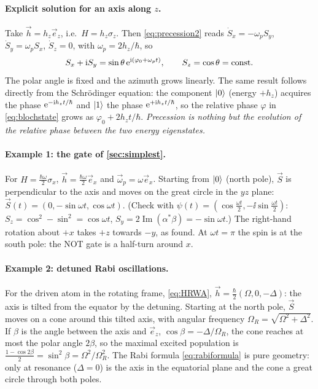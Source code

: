 \paragraph{Explicit solution for an axis along $z$.} Take $\vec h=h_z\vec e_z$, i.e.\ $H=h_z\sigma_z$. Then \cref{eq:precession2} reads $\dot S_x=-\omega_pS_y$,
$\dot S_y=\omega_pS_x$, $\dot S_z=0$, with $\omega_p=2h_z/\hbar$, so
\begin{equation}
  S_x+\mathrm i S_y=\sin\theta\,\mathrm e^{\mathrm i(\varphi_0+\omega_pt)},\qquad S_z=\cos\theta=\text{const}.
\end{equation}
The polar angle is fixed and the azimuth grows linearly. The same result follows directly from the Schrödinger equation: the component $\left|0\right\rangle$ (energy $+h_z$) acquires the
phase $\mathrm e^{-\mathrm i h_zt/\hbar}$ and $\left|1\right\rangle$ the phase $\mathrm e^{+\mathrm i h_zt/\hbar}$, so the relative phase $\varphi$ in \cref{eq:blochstate} grows as $\varphi_0+2h_zt/\hbar$.
\emph{Precession is nothing but the evolution of the relative phase between the two energy eigenstates.}

\paragraph{Example 1: the gate of \cref{sec:simplest}.} For $H=\frac{\hbar\omega}2\sigma_x$, $\vec h=\frac{\hbar\omega}2\vec e_x$ and $\vec\omega_p=\omega\vec e_x$. Starting from
$\left|0\right\rangle$ (north pole), $\vec S$ is perpendicular to the axis and moves on the great circle in the $yz$ plane:
$\vec S(t)=(0,-\sin\omega t,\cos\omega t)$. (Check with $\psi(t)=(\cos\frac{\omega t}2,-\ii\sin\frac{\omega t}2)$: $S_z=\cos^2-\sin^2=\cos\omega t$,
$S_y=2\operatorname{Im}(\alpha^*\beta)=-\sin\omega t$.) The right-hand rotation about $+x$ takes $+z$ towards $-y$, as found. At $\omega t=\pi$ the spin is at the south pole:
the NOT gate is a half-turn around $x$.

\paragraph{Example 2: detuned Rabi oscillations.} For the driven atom in the rotating frame, \cref{eq:HRWA}, $\vec h=\frac\hbar2(\Omega,0,-\Delta)$: the axis is tilted from the
equator by the detuning. Starting at the north pole, $\vec S$ moves on a cone around this tilted axis, with angular frequency $\Omega_R=\sqrt{\Omega^2+\Delta^2}$. If $\beta$
is the angle between the axis and $\vec e_z$, $\cos\beta=-\Delta/\Omega_R$, the cone reaches at most the polar angle $2\beta$, so the maximal excited population is
$\frac{1-\cos2\beta}2=\sin^2\beta=\Omega^2/\Omega_R^2$. The Rabi formula \cref{eq:rabiformula} is pure geometry: only at resonance ($\Delta=0$) is the axis in the equatorial
plane and the cone a great circle through both poles.

